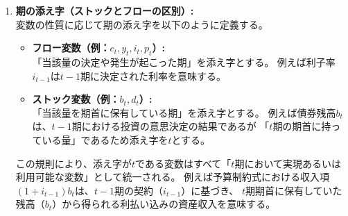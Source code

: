 \begin{enumerate}
        アスタリスク*の有無で示す。
        \begin{itemize}
            \item
            \label{itm:chapter3_definitions_variables_notation_asterisk_home}
                もともと自国通貨建てである変数は*をつけず\(x_t\)のように表す。
            \item
            \label{itm:chapter3_definitions_variables_notation_asterisk_foreign}
                もともと外国通貨建てである変数は*をつけ\(x_t^*\)のように表す。
            \item
            \label{itm:chapter3_definitions_variables_notation_asterisk_def_foreign}
                もともと自国通貨建てである変数\(x_t\)について
                \(x_t^*\equiv(1/e_t^{/*})x_t\)により\(x_t^*\)を定義する。
            \item
            \label{itm:chapter3_definitions_variables_notation_asterisk_def_home}
                もともと外国通貨建てである変数\(x_t^*\)について
                \(x_t\equiv e_t^{/*}x_t^*\)により\(x_t\)を定義する。
        \end{itemize}
        ここで\(e_t^{/*}\)は名目為替レート（自国通貨/外国通貨）である。
        （例：\(\bar{p}_t^{F*},b_t^{h\to F}\)）
    \item
    \label{itm:variables_notation_time_subscript}
        \textbf{期の添え字（ストックとフローの区別）:}\\
        変数の性質に応じて期の添え字を以下のように定義する。
        \begin{itemize}
            \item
            \label{itm:variables_notation_time_subscript_flow}
                \textbf{フロー変数（例：\(c_t, y_t, i_t, p_t\)）:}\\
                「当該量の決定や発生が起こった期」を添え字とする。
                例えば利子率\(i_{t-1}\)は\(t-1\)期に決定された利率を意味する。
            \item
            \label{itm:variables_notation_time_subscript_stock}
                \textbf{ストック変数（例：\(b_t,d_t\)）:}\\
                「当該量を期首に保有している期」を添え字とする。
                例えば債券残高\(b_t\)は、\(t-1\)期における投資の意思決定の結果であるが
                「\(t\)期の期首に持っている量」であるため添え字を\(t\)とする。
        \end{itemize}
        この規則により、添え字が\(t\)である変数はすべて「\(t\)期において実現あるいは利用可能な変数」として統一される。
        例えば予算制約式における収入項\((1+i_{t-1})b_t\)は、\(t-1\)期の契約（\(i_{t-1}\)）に基づき、
        \(t\)期期首に保有していた残高（\(b_t\)）から得られる利払い込みの資産収入を意味する。
\end{enumerate}

